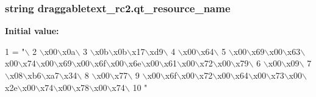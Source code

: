 \subsubsection[{qt\+\_\+resource\+\_\+name}]{\setlength{\rightskip}{0pt plus 5cm}string draggabletext\+\_\+rc2.\+qt\+\_\+resource\+\_\+name}\label{namespacedraggabletext__rc2_a55ace7204dc0428f1f1834de1913257e}
{\bfseries Initial value\+:}
\begin{DoxyCode}
1 = \textcolor{stringliteral}{"\(\backslash\)}
2 \textcolor{stringliteral}{\(\backslash\)x00\(\backslash\)x0a\(\backslash\)}
3 \textcolor{stringliteral}{\(\backslash\)x0b\(\backslash\)x0b\(\backslash\)x17\(\backslash\)xd9\(\backslash\)}
4 \textcolor{stringliteral}{\(\backslash\)x00\(\backslash\)x64\(\backslash\)}
5 \textcolor{stringliteral}{\(\backslash\)x00\(\backslash\)x69\(\backslash\)x00\(\backslash\)x63\(\backslash\)x00\(\backslash\)x74\(\backslash\)x00\(\backslash\)x69\(\backslash\)x00\(\backslash\)x6f\(\backslash\)x00\(\backslash\)x6e\(\backslash\)x00\(\backslash\)x61\(\backslash\)x00\(\backslash\)x72\(\backslash\)x00\(\backslash\)x79\(\backslash\)}
6 \textcolor{stringliteral}{\(\backslash\)x00\(\backslash\)x09\(\backslash\)}
7 \textcolor{stringliteral}{\(\backslash\)x08\(\backslash\)xb6\(\backslash\)xa7\(\backslash\)x34\(\backslash\)}
8 \textcolor{stringliteral}{\(\backslash\)x00\(\backslash\)x77\(\backslash\)}
9 \textcolor{stringliteral}{\(\backslash\)x00\(\backslash\)x6f\(\backslash\)x00\(\backslash\)x72\(\backslash\)x00\(\backslash\)x64\(\backslash\)x00\(\backslash\)x73\(\backslash\)x00\(\backslash\)x2e\(\backslash\)x00\(\backslash\)x74\(\backslash\)x00\(\backslash\)x78\(\backslash\)x00\(\backslash\)x74\(\backslash\)}
10 \textcolor{stringliteral}{"}
\end{DoxyCode}
\hypertarget{namespacedraggabletext__rc2_aac952306275d2818289e10669e0fa8ba}{}
